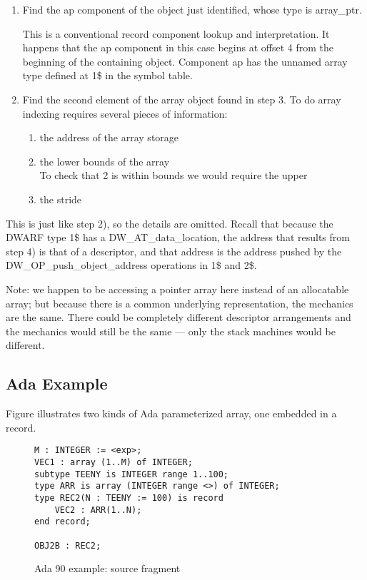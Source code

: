 \begin{enumerate}[1.]
\item  Find the ap component of the object just identified,
whose type is array\_ptr.

This is a conventional record component lookup and
interpretation. It happens that the ap component in this case
begins at offset 4 from the beginning of the containing object.
Component ap has the unnamed array type defined at 1\$ in the
symbol table.

\item  Find the second element of the array object found in step 3. To do array indexing requires
several pieces of information:

\begin{enumerate}[a]
\item  the address of the array storage

\item  the lower bounds of the array \\
\lbrack To check that 2 is within bounds we would require the upper

\item  the stride

\end{enumerate}
\end{enumerate}

This is just like step 2), so the details are omitted. Recall
that because the DWARF type 1\$ has a DW\_AT\_data\_location,
the address that results from step 4) is that of a
descriptor, and that address is the address pushed by the
DW\_OP\_push\_object\_address operations in 1\$ and 2\$.

Note: we happen to be accessing a pointer array here instead
of an allocatable array; but because there is a common
underlying representation, the mechanics are the same. There
could be completely different descriptor arrangements and the
mechanics would still be the same — only the stack machines
would be different.



\subsection{Ada Example}
\label{app:adaexample}

Figure 
illustrates two kinds of Ada parameterized array, one embedded in a record.


\begin{figure}[here]
\begin{lstlisting}
M : INTEGER := <exp>;
VEC1 : array (1..M) of INTEGER;
subtype TEENY is INTEGER range 1..100;
type ARR is array (INTEGER range <>) of INTEGER;
type REC2(N : TEENY := 100) is record
    VEC2 : ARR(1..N);
end record;

OBJ2B : REC2;
\end{lstlisting}
\caption{Ada 90 example: source fragment} \label{fig:adaexamplesourcefragment}
\end{figure}

